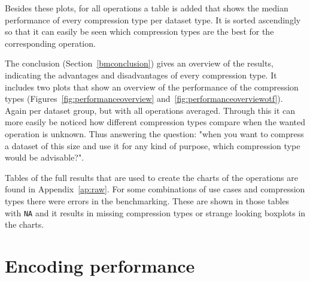 Besides these plots, for all operations a table is added that shows the median performance of every compression type per dataset type.
It is sorted ascendingly so that it can easily be seen which compression types are the best for the corresponding operation.


The conclusion (Section~\ref{bmconclusion}) gives an overview of the results, indicating the advantages and disadvantages of every compression type.
It includes two plots that show an overview of the performance of the compression types (Figures~\ref{fig:performanceoverview} and~\ref{fig:performanceoverviewotf}).
Again per dataset group, but with all operations averaged.
Through this it can more easily be noticed how different compression types compare when the wanted operation is unknown.
Thus answering the question: "when you want to compress a dataset of this size and use it for any kind of purpose, which compression type would be advisable?".

Tables of the full results that are used to create the charts of the operations are found in Appendix~\ref{ap:raw}.
For some combinations of use cases and compression types there were errors in the benchmarking.
These are shown in those tables with \texttt{NA} and it results in missing compression types or strange looking boxplots in the charts.


\newpage
\section{Encoding performance}
\label{sec:encodingperformance}

